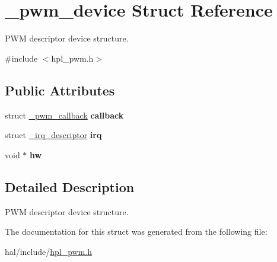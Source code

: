 \hypertarget{struct__pwm__device}{}\section{\+\_\+pwm\+\_\+device Struct Reference}
\label{struct__pwm__device}


P\+WM descriptor device structure.  




{\ttfamily \#include $<$hpl\+\_\+pwm.\+h$>$}

\subsection*{Public Attributes}
\begin{DoxyCompactItemize}
\item 
\mbox{\label{struct__pwm__device_af6f246a306f3be0fdbc9c51d1569fdb8}} 
struct \hyperlink{struct__pwm__callback}{\+\_\+pwm\+\_\+callback} {\bfseries callback}
\item 
\mbox{\label{struct__pwm__device_ac3e3220ab6ffde3643a2d22c6b176a83}} 
struct \hyperlink{struct__irq__descriptor}{\+\_\+irq\+\_\+descriptor} {\bfseries irq}
\item 
\mbox{\label{struct__pwm__device_a0b843ad298618b207e8420eb1af13638}} 
void $\ast$ {\bfseries hw}
\end{DoxyCompactItemize}


\subsection{Detailed Description}
P\+WM descriptor device structure. 

The documentation for this struct was generated from the following file\+:\begin{DoxyCompactItemize}
\item 
hal/include/\hyperlink{hpl__pwm_8h}{hpl\+\_\+pwm.\+h}\end{DoxyCompactItemize}
